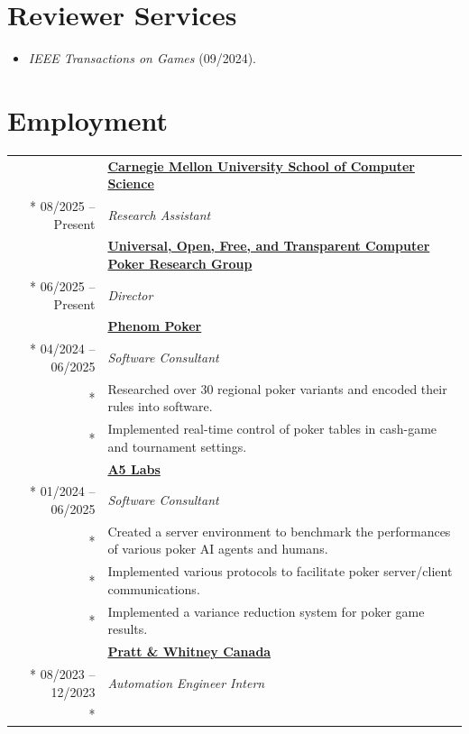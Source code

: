 \documentclass{article}
\begin{document}
	\section*{Reviewer Services}

	\begin{itemize}[noitemsep]
		\item \textit{IEEE Transactions on Games} (09/2024).
	\end{itemize}

	\section*{Employment}

	\begin{tabularx}{\textwidth}{r X}
		& \textbf{\href{https://www.cs.cmu.edu/}{Carnegie Mellon University School of Computer Science}} \\*
		08/2025 -- Present & \textit{Research Assistant} \\
		\addlinespace
		& \textbf{\href{https://uoftcprg.com/}{Universal, Open, Free, and Transparent Computer Poker Research Group}} \\*
		06/2025 -- Present & \textit{Director} \\
		\addlinespace
		& \textbf{\href{https://www.phenompoker.com/}{Phenom Poker}} \\*
		04/2024 -- 06/2025 & \textit{Software Consultant} \\*
		& {\small Researched over 30 regional poker variants and encoded their rules into software.} \\*
		& {\small Implemented real-time control of poker tables in cash-game and tournament settings.} \\
		\addlinespace
		& \textbf{\href{https://a5labs.co/}{A5 Labs}} \\*
		01/2024 -- 06/2025 & \textit{Software Consultant} \\*
		& {\small Created a server environment to benchmark the performances of various poker AI agents and humans.} \\*
		& {\small Implemented various protocols to facilitate poker server/client communications.} \\*
		& {\small Implemented a variance reduction system for poker game results.} \\
		\addlinespace
		& \textbf{\href{https://www.prattwhitney.com/}{Pratt \& Whitney Canada}} \\*
		08/2023 -- 12/2023 & \textit{Automation Engineer Intern} \\*

\end{tabularx}
\end{document}
